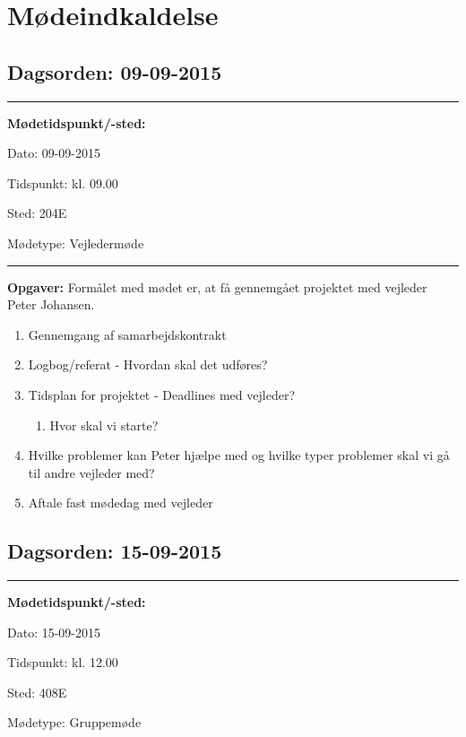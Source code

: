 \chapter{Mødeindkaldelse}


\section{Dagsorden: 09-09-2015}
\hrule



\textbf{Mødetidspunkt/-sted:} 

Dato: \tabto{7em} 09-09-2015

Tidspunkt: \tabto{7em} kl. 09.00

Sted: \tabto{7em} 204E

Mødetype: \tabto{7em} Vejledermøde \newline


\hrule
\textbf{Opgaver:} \newline
Formålet med mødet er, at få gennemgået projektet med vejleder Peter Johansen.
\begin{enumerate}
\item Gennemgang af samarbejdskontrakt

\item Logbog/referat - Hvordan skal det udføres?

\item Tidsplan for projektet - Deadlines med vejleder?
\begin{enumerate}
\item Hvor skal vi starte?
\end{enumerate}
\item Hvilke problemer kan Peter hjælpe med og hvilke typer problemer skal vi gå til andre vejleder med?
\item Aftale fast mødedag med vejleder
\end{enumerate}

\newpage
\section{Dagsorden: 15-09-2015}
\hrule



\textbf{Mødetidspunkt/-sted:} 

Dato: \tabto{7em} 15-09-2015

Tidspunkt: \tabto{7em} kl. 12.00

Sted: \tabto{7em} 408E

Mødetype: \tabto{7em} Gruppemøde \newline


